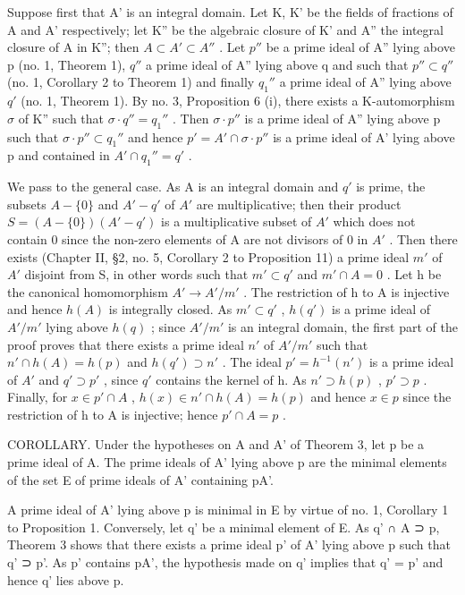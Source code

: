 Suppose first that A' is an integral domain. Let K, K' be the fields of fractions of A and A' respectively; let K'' be the algebraic closure of K' and A'' the integral closure of A in K''; then \(A \subset A' \subset A''\) . Let \(p''\) be a prime ideal of A'' lying above p (no. 1, Theorem 1), \(q''\) a prime ideal of A'' lying above q and such that \(p'' \subset q''\) (no. 1, Corollary 2 to Theorem 1) and finally \(q_{1}''\) a prime ideal of A'' lying above \(q'\) (no. 1, Theorem 1). By no. 3, Proposition 6 (i), there exists a K-automorphism \(\sigma\) of K'' such that \(\sigma \cdot q'' = q_{1}''\) . Then \(\sigma \cdot p''\) is a prime ideal of A'' lying above p such that \(\sigma \cdot p'' \subset q_{1}''\) and hence \(p' = A' \cap \sigma \cdot p''\) is a prime ideal of A' lying above p and contained in \(A' \cap q_{1}'' = q'\) .

We pass to the general case. As A is an integral domain and \(q'\) is prime, the subsets \(A - \{0\}\) and \(A' - q'\) of \(A'\) are multiplicative; then their product \(S = (A - \{0\})(A' - q')\) is a multiplicative subset of \(A'\) which does not contain 0 since the non-zero elements of A are not divisors of 0 in \(A'\) . Then there exists (Chapter II, §2, no. 5, Corollary 2 to Proposition 11) a prime ideal \(m'\) of \(A'\) disjoint from S, in other words such that \(m' \subset q'\) and \(m' \cap A = 0\) . Let h be the canonical homomorphism \(A' \to A'/m'\) . The restriction of h to A is injective and hence \(h(A)\) is integrally closed. As \(m' \subset q'\) , \(h(q')\) is a prime ideal of \(A'/m'\) lying above \(h(q)\) ; since \(A'/m'\) is an integral domain, the first part of the proof proves that there exists a prime ideal \(n'\) of \(A'/m'\) such that \(n' \cap h(A) = h(p)\) and \(h(q') \supset n'\) . The ideal \(p' = h^{-1}(n')\) is a prime ideal of \(A'\) and \(q' \supset p'\) , since \(q'\) contains the kernel of h. As \(n' \supset h(p)\) , \(p' \supset p\) . Finally, for \(x \in p' \cap A\) , \(h(x) \in n' \cap h(A) = h(p)\) and hence \(x \in p\) since the restriction of h to A is injective; hence \(p' \cap A = p\) .

COROLLARY. Under the hypotheses on A and A' of Theorem 3, let p be a prime ideal of A. The prime ideals of A' lying above p are the minimal elements of the set E of prime ideals of A' containing pA'.

A prime ideal of A' lying above p is minimal in E by virtue of no. 1, Corollary 1 to Proposition 1. Conversely, let q' be a minimal element of E. As q' ∩ A ⊃ p, Theorem 3 shows that there exists a prime ideal p' of A' lying above p such that q' ⊃ p'. As p' contains pA', the hypothesis made on q' implies that q' = p' and hence q' lies above p.

